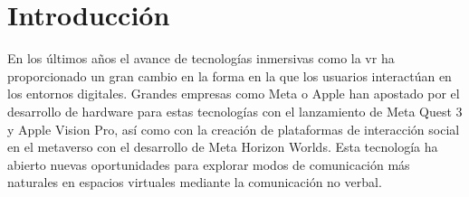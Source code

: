 \chapter{Introducción}
\label{cap:introduccion}






En los últimos años el avance de tecnologías inmersivas como la \gls{vr} ha proporcionado un gran cambio en la forma en la que los usuarios interactúan en los entornos digitales.
Grandes empresas como Meta o Apple han apostado por el desarrollo de hardware para estas tecnologías con el lanzamiento de Meta Quest 3 y Apple Vision Pro, así como con la creación de plataformas de interacción social en el \gls{metaverso} con el desarrollo de Meta Horizon Worlds.
Esta tecnología ha abierto nuevas oportunidades para explorar modos de comunicación más naturales en espacios virtuales mediante la comunicación no verbal.

